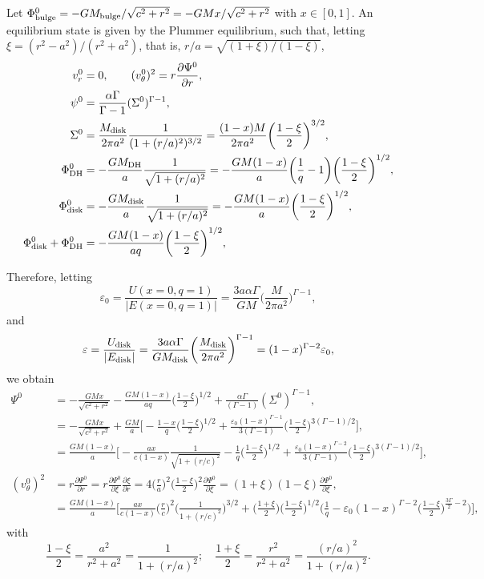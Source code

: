 \documentclass[11pt]{article}
\newcommand{\vr}{v_{r}}
\newcommand{\vt}{v_{\theta}}
\newcommand{\Sigmad}{\Sigma_{\rm{disk}}}
\newcommand{\Phib}{\Phi_{\rm{bulge}}}
\newcommand{\Phid}{\Phi_{\rm{disk}}}
\newcommand{\Phidh}{\Phi_{\rm{DH}}}
\newcommand{\Mb}{M_{\rm{bulge}}}
\newcommand{\Md}{M_{\rm{disk}}}
\newcommand{\Mdh}{M_{\rm{DH}}}
\begin{document}
 Let $\Phib^0 = - G \Mb/\sqrt{c^2+r^2}=- G  M x/\sqrt{c^2+r^2}$ with $x\in [0,1]$. An equilibrium state is given by the Plummer equilibrium, such that,  letting $\xi = (r^2-a^2)/(r^2+a^2) $, that is, $r/a=\sqrt{(1+\xi)/(1-\xi)}$,
\begin{align}
\vr^0 &= 0,\quad \quad (\vt^0)^2 = r \frac{\partial \Psi^0}{\partial r}, \\
 \psi^0 &= \frac{\alpha \Gamma}{\Gamma-1} (\Sigma^0)^{\Gamma-1} ,\\
 \Sigma^0 &= \frac{\Md}{2\pi a^2} \frac{1}{(1+(r/a)^2)^{3/2}} =\frac{(1-x)M}{2\pi a^2}   \bigg(\frac{1-\xi}{2}\bigg)^{3/2},\\
 \Phidh^0 &= -\frac{G \Mdh}{a } \frac{1}{\sqrt{1+(r/a)^2}} = -\frac{G M(1-x)}{a }\bigg(\frac{1}{q}-1\bigg)   \bigg(\frac{1-\xi}{2}\bigg)^{1/2} ,\\
 \Phid^0 &= -\frac{G \Md}{a } \frac{1}{\sqrt{1+(r/a)^2}} = -\frac{G M (1-x)}{a } \bigg(\frac{1-\xi}{2}\bigg)^{1/2} ,\\
 \Phid^0+\Phidh^0 &= -\frac{G M (1-x)}{a q } \bigg(\frac{1-\xi}{2}\bigg)^{1/2} ,\\
\end{align}


Therefore, letting  $$\varepsilon_0 = \frac{U(x=0,q=1)}{|E(x=0,q=1)|} =\frac{3a \alpha \Gamma}{GM} \bigg(\frac{M}{2\pi a^2}\bigg)^{\Gamma-1},$$
and
$$\varepsilon = \frac{U_{\mathrm{disk}}}{|E_{\mathrm{disk}}|} =\frac{3a \alpha \Gamma}{G\Md} \bigg(\frac{\Md}{2\pi a^2}\bigg)^{\Gamma-1} = (1-x)^{\Gamma-2} \varepsilon_0,$$  we obtain 
\begin{align}
\Psi^0 &=  - \frac{G M x}{\sqrt{c^2+r^2}}-\frac{G M (1-x)}{a q}\bigg(\frac{1-\xi}{2}\bigg)^{1/2} + \frac{\alpha \Gamma}{(\Gamma-1)} (\Sigma^0)^{\Gamma-1} ,\\
{}&=  -\frac{G M x}{\sqrt{c^2+r^2}}+\frac{G M }{a} \bigg[-\frac{1-x}{q}\bigg(\frac{1-\xi}{2}\bigg)^{1/2} + \frac{\varepsilon_0 (1-x)^{\Gamma-1}}{3(\Gamma-1)}\bigg(\frac{1-\xi}{2}\bigg)^{3(\Gamma-1)/2} \bigg] ,\\
&=  \frac{G M(1-x)}{a}\bigg[-\frac{ ax}{c(1-x)}\frac{1}{ \sqrt{1+(r/c)^2}} - \frac{1}{q} \bigg(\frac{1-\xi}{2}\bigg)^{1/2} + \frac{\varepsilon_0  (1-x)^{\Gamma-2}}{3(\Gamma-1)}\bigg(\frac{1-\xi}{2}\bigg)^{3(\Gamma-1)/2} \bigg],\\
(\vt^0)^2 &= r \frac{\partial \Psi^0}{\partial r} =r \frac{\partial \Psi^0}{\partial \xi} \frac{\partial \xi}
{\partial r} = 4\bigg(\frac{r}{a}\bigg)^2    \bigg(\frac{1-\xi}{2}\bigg)^2 \frac{\partial \Psi^0}{\partial \xi}= (1+\xi) (1-\xi) \frac{\partial \Psi^0}{\partial \xi}  ,\\
&=\frac{GM(1-x)}{a}\bigg[\frac{ax}{c(1-x)}\bigg( \frac{r}{c}\bigg)^2 \bigg(\frac{1}{1+(r/c)^2}\bigg)^{3/2} 
+ \bigg(\frac{1+\xi}{2}\bigg) \bigg(\frac{1-\xi}{2}\bigg)^{1/2} \bigg(\frac{1}{q}-  \varepsilon_0 (1-x)^{\Gamma-2}\bigg(\frac{1-\xi}{2}\bigg)^{\frac{3\Gamma}{2}-2} \bigg)   \bigg], 
\end{align}
with
$$\frac{1-\xi}{2}= \frac{a^2}{r^2+a^2}= \frac{1}{1+(r/a)^2}; \quad \frac{1+\xi}{2}= \frac{r^2}{r^2+a^2}= \frac{(r/a)^2}{1+(r/a)^2}.$$
\end{document}
